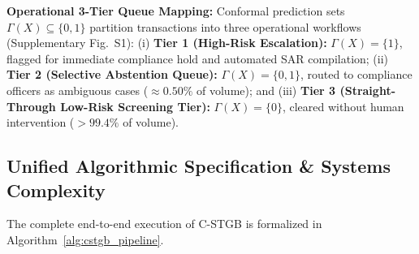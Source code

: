 \textbf{Operational 3-Tier Queue Mapping:} Conformal prediction sets $\Gamma(X) \subseteq \{0, 1\}$ partition transactions into three operational workflows (Supplementary Fig.~S1): (i) \textbf{Tier 1 (High-Risk Escalation):} $\Gamma(X) = \{1\}$, flagged for immediate compliance hold and automated SAR compilation; (ii) \textbf{Tier 2 (Selective Abstention Queue):} $\Gamma(X) = \{0, 1\}$, routed to compliance officers as ambiguous cases ($\approx 0.50\%$ of volume); and (iii) \textbf{Tier 3 (Straight-Through Low-Risk Screening Tier):} $\Gamma(X) = \{0\}$, cleared without human intervention ($>99.4\%$ of volume).

\subsection{Unified Algorithmic Specification \& Systems Complexity}
\label{sec:algorithm_complexity}
The complete end-to-end execution of C-STGB is formalized in Algorithm~\ref{alg:cstgb_pipeline}.

